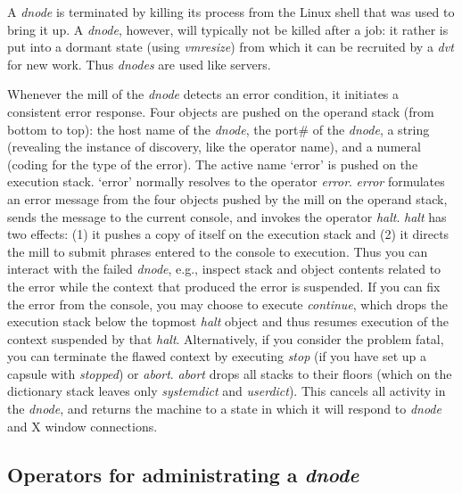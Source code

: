 A \emph{dnode} is terminated by killing its process from the Linux shell that was used to bring it up. A \emph{dnode}, however, will typically not be killed after a job: it rather is put into a dormant state (using \emph{vmresize}) from which it can be recruited by a \emph{dvt} for new work. Thus \emph{dnodes} are used like servers.

Whenever the mill of the \emph{dnode} detects an error condition, it initiates a consistent error response. Four objects are pushed on the operand stack (from bottom to top): the host name of the \emph{dnode}, the port\# of the \emph{dnode}, a string (revealing the instance of discovery, like the operator name), and a numeral (coding for the type of the error). The active name `error' is pushed on the execution stack. `error' normally resolves to the operator \emph{error}. \emph{error} formulates an error message from the four objects pushed by the mill on the operand stack, sends the message to the current console, and invokes the operator \emph{halt}. \emph{halt} has two effects: (1) it pushes a copy of itself on the execution stack and (2) it directs the mill to submit phrases entered to the console to execution. Thus you can interact with the failed \emph{dnode}, e.g., inspect stack and object contents related to the error while the context that produced the error is suspended. If you can fix the error from the console, you may choose to execute \emph{continue}, which drops the execution stack below the topmost \emph{halt} object and thus resumes execution of the context suspended by that \emph{halt}. Alternatively, if you consider the problem fatal, you can terminate the flawed context by executing \emph{stop} (if you have set up a capsule with \emph{stopped}) or \emph{abort}. \emph{abort} drops all stacks to their floors (which on the dictionary stack leaves only \emph{systemdict} and \emph{userdict}). This cancels all activity in the \emph{dnode}, and returns the machine to a state in which it will respond to \emph{dnode} and X window connections.


\subsection{Operators for administrating  a \emph{dnode}}\label{ssec:opsdnode} 



